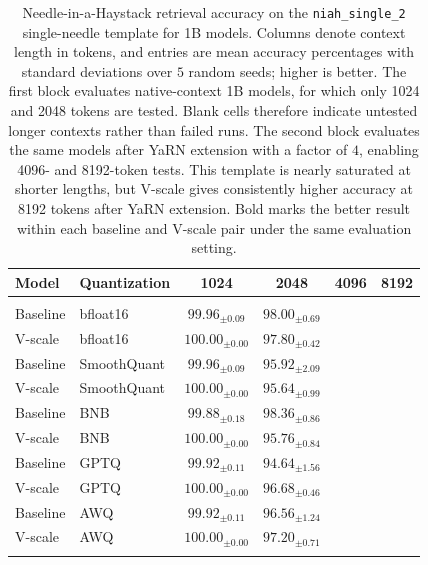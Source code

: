 \documentclass{article}
\theoremstyle{plain}
\theoremstyle{definition}
\theoremstyle{remark}
\begin{document}
\begin{table}[ht]
    \centering
    \caption{
    Needle-in-a-Haystack retrieval accuracy on the \texttt{niah\_single\_2} single-needle template for 1B models.
    Columns denote context length in tokens, and entries are mean accuracy percentages with standard deviations over $5$ random seeds; higher is better.
    The first block evaluates native-context 1B models, for which only 1024 and 2048 tokens are tested.
    Blank cells therefore indicate untested longer contexts rather than failed runs.
    The second block evaluates the same models after YaRN extension with a factor of $4$, enabling 4096- and 8192-token tests.
    This template is nearly saturated at shorter lengths, but V-scale gives consistently higher accuracy at 8192 tokens after YaRN extension.
    Bold marks the better result within each baseline and V-scale pair under the same evaluation setting.
    }\label{tab:niah_single2_1b}
    \begin{tabular}{llcccc}
        \toprule
        Model & Quantization & 1024 & 2048 & 4096 & 8192 \\
        \midrule
        \rowcolor[gray]{0.9}\multicolumn{6}{l}{\emph{1B Models}} \\
        Baseline & bfloat16 & $99.96_{\pm 0.09}$ & $\mathbf{98.00}_{\pm 0.69}$ & & \\
        V-scale & bfloat16 & $\mathbf{100.00}_{\pm 0.00}$ & $97.80_{\pm 0.42}$ & & \\
        Baseline & SmoothQuant & $99.96_{\pm 0.09}$ & $\mathbf{95.92}_{\pm 2.09}$ & & \\
        V-scale & SmoothQuant & $\mathbf{100.00}_{\pm 0.00}$ & $95.64_{\pm 0.99}$ & & \\
        Baseline & BNB & $99.88_{\pm 0.18}$ & $\mathbf{98.36}_{\pm 0.86}$ & & \\
        V-scale & BNB & $\mathbf{100.00}_{\pm 0.00}$ & $95.76_{\pm 0.84}$ & & \\
        Baseline & GPTQ & $99.92_{\pm 0.11}$ & $94.64_{\pm 1.56}$ & & \\
        V-scale & GPTQ & $\mathbf{100.00}_{\pm 0.00}$ & $\mathbf{96.68}_{\pm 0.46}$ & & \\
        Baseline & AWQ & $99.92_{\pm 0.11}$ & $96.56_{\pm 1.24}$ & & \\
        V-scale & AWQ & $\mathbf{100.00}_{\pm 0.00}$ & $\mathbf{97.20}_{\pm 0.71}$ & & \\
        \midrule
        \rowcolor[gray]{0.9}\multicolumn{6}{l}{\emph{1B Models with YaRN Extension} (yarn\_factor$=4$)} \\

\end{tabular}
\end{table}
\end{document}
